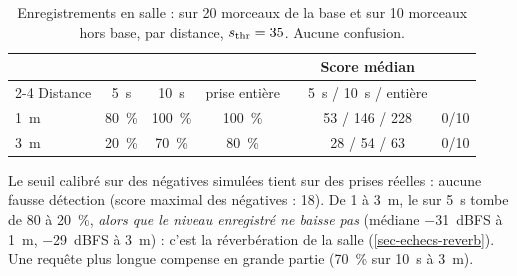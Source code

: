 \begin{table}[h]
  \centering\small
  \caption{Enregistrements en salle : \TBD{} sur 20 morceaux de la base et \TFD{} sur 10
  morceaux hors base, par distance, $s_{\mathrm{thr}} = 35$. Aucune confusion.}
  \label{tab-salle}
  \begin{tabular}{@{}lcccccc@{}}
    \toprule
    & \multicolumn{3}{c}{\TBD{}} & & Score médian & \TFD{} \\
    \cmidrule(lr){2-4}
    Distance & \qty{5}{\second} & \qty{10}{\second} & prise entière & & \qty{5}{\second} / \qty{10}{\second} / entière & \\
    \midrule
    \qty{1}{\metre} & \qty{80}{\percent} & \qty{100}{\percent} & \qty{100}{\percent} & & 53 / 146 / 228 & 0/10 \\
    \qty{3}{\metre} & \qty{20}{\percent} & \qty{70}{\percent}  & \qty{80}{\percent}  & & 28 / 54 / 63   & 0/10 \\
    \bottomrule
  \end{tabular}
\end{table}

Le seuil calibré sur des négatives simulées tient sur des prises réelles : aucune fausse
détection (score maximal des négatives : 18). De 1 à \qty{3}{\metre}, le \TBD{} sur
\qty{5}{\second} tombe de 80 à \qty{20}{\percent}, \emph{alors que le niveau enregistré ne
baisse pas} (médiane \qty{-31}{dBFS} à \qty{1}{\metre}, \qty{-29}{dBFS} à \qty{3}{\metre}) :
c'est la réverbération de la salle (\cref{sec-echecs-reverb}). Une requête plus longue
compense en grande partie (\qty{70}{\percent} sur \qty{10}{\second} à \qty{3}{\metre}).
